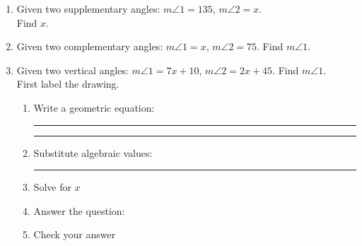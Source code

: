 \documentclass[12pt, oneside]{article}
\begin{document}
\begin{enumerate}
  \newpage
            \item Given two supplementary angles: $m \angle 1 = 135$, $m \angle 2 = x$.\\ Find $x$. \vspace{2cm}
            \item Given two complementary angles: $m \angle 1 = x$, $m \angle 2 = 75$. Find $m \angle 1$. \vspace{2cm}

            \item Given two vertical angles: $m \angle 1 = 7x+10$, $m \angle 2 = 2x+45$. Find $m \angle 1$.\\
            First label the drawing.
            \begin{flushright}
            \end{flushright}
            \begin{enumerate}
              \item Write a geometric equation: \rule{4cm}{0.15mm} \hspace{1cm} \rule{4cm}{0.15mm}
              \vspace{.7cm}
              \item Substitute algebraic values: \rule{4cm}{0.15mm}
              \item Solve for $x$
              \vspace{2cm}
              \item Answer the question:
              \vspace{2cm}
              \item Check your answer
            \end{enumerate}
          \end{enumerate}

  \newpage
\end{document}
